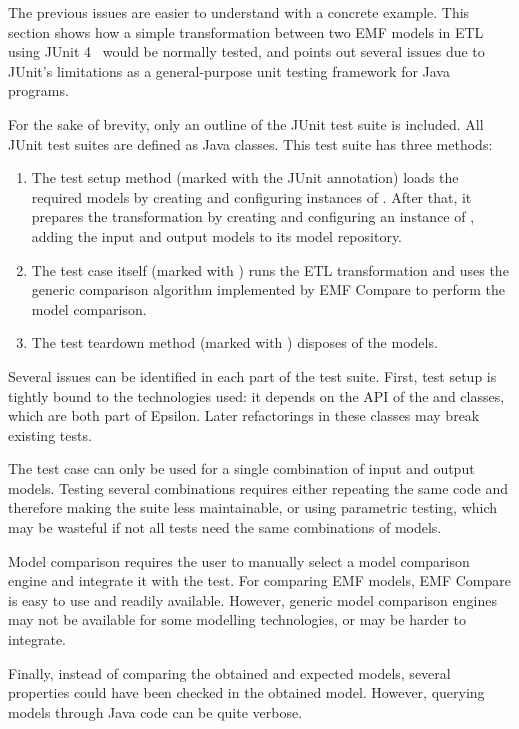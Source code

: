 The previous issues are easier to understand with a concrete example. This section shows how a simple transformation between two EMF models in ETL using JUnit 4~\cite{JUnit2011} would be normally tested, and points out several issues due to JUnit's limitations as a general-purpose unit testing framework for Java programs.

For the sake of brevity, only an outline of the JUnit test suite is included. All JUnit test suites are defined as Java classes. This test suite has three methods:

\begin{enumerate}
\item The test setup method (marked with the  JUnit annotation) loads the required models by creating and configuring instances of . After that, it prepares the transformation by creating and configuring an instance of , adding the input and output models to its model repository.

\item The test case itself (marked with ) runs the ETL transformation and uses the generic comparison algorithm implemented by EMF Compare to perform the model comparison.

\item The test teardown method (marked with ) disposes of the models.
\end{enumerate}

Several issues can be identified in each part of the test suite. First, test setup is tightly bound to the technologies used: it depends on the API of the  and  classes, which are both part of Epsilon. Later refactorings in these classes may break existing tests.

The test case can only be used for a single combination of input and output models. Testing several combinations requires either repeating the same code and therefore making the suite less maintainable, or using parametric testing, which may be wasteful if not all tests need the same combinations of models.

Model comparison requires the user to manually select a model comparison engine and integrate it with the test. For comparing EMF models, EMF Compare is easy to use and readily available. However, generic model comparison engines may not be available for some modelling technologies, or may be harder to integrate.

Finally, instead of comparing the obtained and expected models, several properties could have been checked in the obtained model. However, querying models through Java code can be quite verbose.

